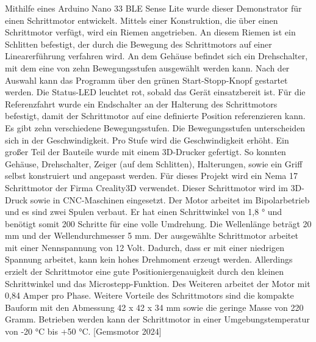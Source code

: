 \documentclass[25pt,a0paper, portrait]{tikzposter}
\begin{document}
\begin{columns}
	{
		{
			Mithilfe eines Arduino Nano 33 BLE Sense Lite wurde dieser Demonstrator für einen Schrittmotor entwickelt. Mittels einer Konstruktion, die über einen Schrittmotor verfügt, wird ein Riemen angetrieben. An diesem Riemen ist ein Schlitten befestigt, der durch die Bewegung des Schrittmotors auf einer Linearerführung verfahren wird. An dem Gehäuse befindet sich ein Drehschalter, mit dem eine von zehn Bewegungsstufen ausgewählt werden kann. Nach der Auswahl kann das Programm über den grünen Start-Stopp-Knopf gestartet werden. Die Status-LED leuchtet rot, sobald das Gerät einsatzbereit ist. Für die Referenzfahrt wurde ein Endschalter an der Halterung des Schrittmotors befestigt, damit der Schrittmotor auf eine definierte Position referenzieren kann. Es gibt zehn verschiedene Bewegungsstufen. Die Bewegungsstufen unterscheiden sich in der Geschwindigkeit. Pro Stufe wird die Geschwindigkeit erhöht.
			Ein großer Teil der Bauteile wurde mit einem 3D-Drucker gefertigt. So konnten Gehäuse, Drehschalter, Zeiger (auf dem Schlitten), Halterungen, sowie ein Griff selbst konstruiert und angepasst werden. 
		}
		{
			Für dieses Projekt wird ein Nema 17 Schrittmotor der Firma Creality3D verwendet. Dieser Schrittmotor wird im 3D-Druck sowie in CNC-Maschinen eingesetzt. Der Motor arbeitet im Bipolarbetrieb und es sind zwei Spulen verbaut. Er hat einen Schrittwinkel von 1,8 ° und
			benötigt somit 200 Schritte für eine volle Umdrehung. Die Wellenlänge beträgt 20 mm und der Wellendurchmesser 5 mm. Der ausgewählte Schrittmotor arbeitet mit einer Nennspannung von 12 Volt. Dadurch, dass er mit einer niedrigen Spannung arbeitet, kann kein hohes Drehmoment erzeugt werden. Allerdings erzielt der Schrittmotor eine gute Positioniergenauigkeit durch den kleinen Schrittwinkel und das Microstepp-Funktion. Des Weiteren arbeitet der Motor mit 0,84 Amper pro Phase. Weitere Vorteile des Schrittmotors sind die kompakte Bauform mit den Abmessung 42 x 42 x 34 mm sowie die geringe Masse von 220 Gramm. Betrieben werden kann der Schrittmotor in einer Umgebungstemperatur von -20 °C bis +50 °C. [Gemsmotor 2024] 
		}
	}
\end{columns}
\end{document}
